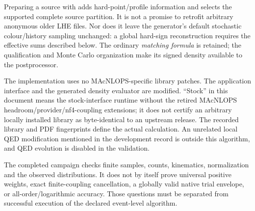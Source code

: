 Preparing a source with  adds hard-point/profile
information and selects the supported complete source partition. It is
not a promise to retrofit arbitrary anonymous older LHE files. Nor does
it leave the generator's default stochastic colour/history sampling
unchanged: a global hard-sign reconstruction requires the effective sums
described below. The ordinary \emph{matching formula} is retained; the
qualification and Monte Carlo organization make its signed density
available to the postprocessor.

The implementation uses no MAcNLOPS-specific \pythia{} library patches.
The application interface and the generated density evaluator are
modified. ``Stock'' in this document means the stock-interface runtime
without the retired MAcNLOPS headroom/provider/nf4-coupling extensions; it
does not certify an arbitrary locally installed library as byte-identical
to an upstream release. The recorded library and PDF fingerprints define
the actual calculation. An unrelated local QED modification mentioned in
the development record is outside this algorithm, and QED evolution is
disabled in the validation.

The completed campaign checks finite samples, counts, kinematics,
normalization and the observed distributions. It does not by itself prove
universal positive weights, exact finite-coupling cancellation, a
globally valid native trial envelope, or all-order/logarithmic accuracy.
Those questions must be separated from successful execution of the
declared event-level algorithm.
